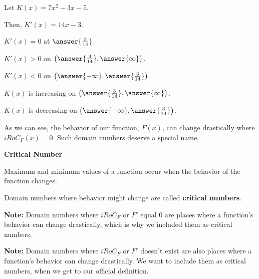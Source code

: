 \documentclass{ximera}
\begin{document}
\begin{question} 



Let $K(x) = 7 x^2 - 3 x - 5$.

Then, $K'(x) = 14 x - 3$.

$K'(x) = 0$ at $\answer{\frac{3}{14}}$.

$K'(x) > 0$ on $\left( \answer{\frac{3}{14}} , \answer{\infty} \right)$.

$K'(x) < 0$ on $\left( \answer{-\infty}, \answer{\frac{3}{14}} \right)$.

$K(x)$ is increasing on $\left( \answer{\frac{3}{14}} , \answer{\infty} \right)$.

$K(x)$ is decreasing on $\left( \answer{-\infty}, \answer{\frac{3}{14}} \right)$.

\end{question}

























As we can see, the behavior of our function, $F(x)$, can change drastically where $iRoC_F(x) = 0$.  Such domain numbers deserve a special name.



\begin{idea} \textbf{\textcolor{blue!55!black}{Critical Number}}  


Maximum and minimum values of a function occur when the behavior of the function changes.

Domain numbers where behavior might change are called \textbf{critical numbers}.


\end{idea}


\textbf{Note: } Domain numbers where $iRoC_F$ or $F'$ equal $0$ are places where a function's behavior can change drastically, which is why we included them as critical numbers.

\textbf{Note: } Domain numbers where $iRoC_F$ or $F'$ doesn't exist are also places where a function's behavior can change drastically. We want to include them as critical numbers, when we get to our official definition.
\end{document}
